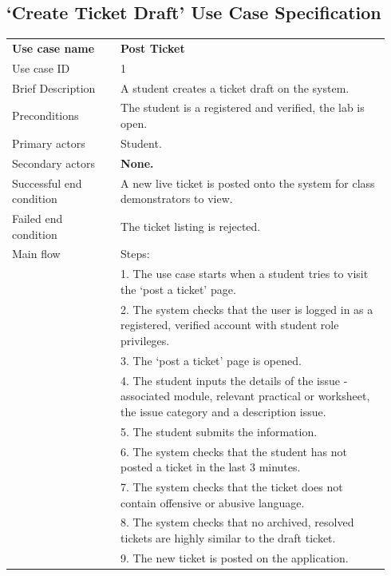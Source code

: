 \subsection*{`Create Ticket Draft' Use Case Specification}
\begin{table}[H]
\centering
 \begin{tabular}{p{0.27\linewidth}  p{0.67\linewidth}}
 \textbf{Use case name} & \textbf{Post Ticket}  \\
 Use case ID & 1\\
 Brief Description & A student creates a ticket draft on the system.\\
 Preconditions & The student is a registered and verified, the lab is open.\\
 Primary actors & Student. \\
 Secondary actors & \textbf{None.} \\
 Successful end condition & A new live ticket is posted onto the system for class demonstrators to view. \\
 Failed end condition & The ticket listing is rejected. \\
 Main flow & Steps:\\
 & 1. The use case starts when a student tries to visit the `post a ticket' page.\\
 & 2. The system checks that the user is logged in as a registered, verified account with student role privileges. \\
 & 3. The `post a ticket' page is opened. \\
 & 4. The student inputs the details of the issue - associated module, relevant practical or worksheet, the issue category and a description issue.\\
 & 5. The student submits the information. \\
 & 6. The system checks that the student has not posted a ticket in the last 3 minutes. \\
 & 7. The system checks that the ticket does not contain offensive or abusive language. \\
 & 8. The system checks that no archived, resolved tickets are highly similar to the draft ticket.\\
 & 9. The new ticket is posted on the application.\\


\end{tabular}
\end{table}
